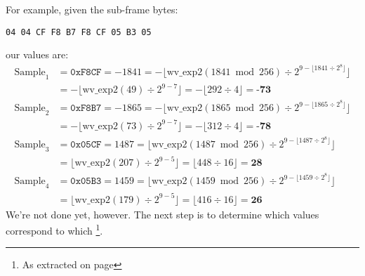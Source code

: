 \par
\noindent
For example, given the sub-frame bytes:
\begin{Verbatim}
04 04 CF F8 B7 F8 CF 05 B3 05
\end{Verbatim}
our  values are:
\begin{align*}
\text{Sample}_1 &= \texttt{0xF8CF} = -1841
 = -\lfloor \text{wv\_exp2}(1841 \bmod{256}) \div 2 ^ {9 - \lfloor 1841 \div 2 ^ 8 \rfloor} \rfloor \\
&= -\lfloor \text{wv\_exp2}(49) \div 2 ^ {9 - 7} \rfloor
 = -\lfloor 292 \div 4 \rfloor = \textbf{-73} \\
\text{Sample}_2 &= \texttt{0xF8B7} = -1865
 = -\lfloor \text{wv\_exp2}(1865 \bmod{256}) \div 2 ^ {9 - \lfloor 1865 \div 2 ^ 8 \rfloor} \rfloor \\
&= -\lfloor \text{wv\_exp2}(73) \div 2 ^ {9 - 7} \rfloor
 =  -\lfloor 312 \div 4 \rfloor = \textbf{-78} \\
\text{Sample}_3 &= \texttt{0x05CF} = 1487
 = \lfloor \text{wv\_exp2}(1487 \bmod{256}) \div 2 ^ {9 - \lfloor 1487 \div 2 ^ 8 \rfloor} \rfloor \\
&= \lfloor \text{wv\_exp2}(207) \div 2 ^ {9 - 5} \rfloor
 = \lfloor 448 \div 16 \rfloor = \textbf{28} \\
\text{Sample}_4 &= \texttt{0x05B3} = 1459
 = \lfloor \text{wv\_exp2}(1459 \bmod{256}) \div 2 ^ {9 - \lfloor 1459 \div 2 ^ 8 \rfloor} \rfloor \\
&= \lfloor \text{wv\_exp2}(179) \div 2 ^ {9 - 5} \rfloor
 = \lfloor 416 \div 16 \rfloor = \textbf{26}
\end{align*}
We're not done yet, however.
The next step is to determine which 
values correspond to which \footnote{As
extracted on page \pageref{wavpack_decorr_terms}}.


